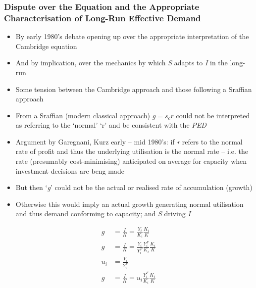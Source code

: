 \documentclass[a4paper,twoside]{article}
\numberwithin{equation}{section}
\numberwithin{figure}{section}
\begin{document}
\subsubsection{Dispute over the Equation and the Appropriate Characterisation of Long-Run Effective Demand}
	\begin{itemize}
		\item By early 1980's debate opening up over the appropriate interpretation of the Cambridge equation
		\item And by implication, over the mechanics by which \textit{S} adapts to \textit{I} in the long-run
		\item Some tension between the Cambridge approach and those following a Sraffian approach
		\item From a Sraffian (modern classical approach) \(g = s_cr\)  could not be interpreted as referring to the `normal' `r' and be consistent with the \textit{PED}
		\item Argument by Garegnani, Kurz early -- mid 1980's: if \textit{r} refers to the normal rate of profit and thus the underlying utilisation is the normal rate -- i.e. the rate (presumably cost-minimising) anticipated on average for capacity when investment decisions are beng made
		\item But then `\textit{g}' could not be the actual or realised rate of accumulation (growth)
		\item Otherwise this would imply an actual growth generating normal utilisation and thus demand conforming to capacity; and \textit{S} driving \textit{I}
	\end{itemize}
	\begin{align*}
		g &= \frac{I}{K} = \frac{Y_i}{K_i}\frac{K_i}{K}\\
		g &= \frac{I}{K} = \frac{Y_i}{Y_i^F}\frac{Y_i^F}{K_i}\frac{K_i}{K}\\
		u_i &= \frac{Y_i}{Y_i^F}\\
		g &= \frac{I}{K} = u_i \frac{Y_i^F}{K_i}\frac{K_i}{K}
	\end{align*}
\end{document}
